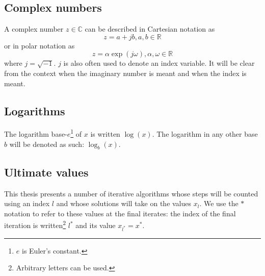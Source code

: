 \subsection{Complex numbers}

A complex number $z \in \mathbb{C}$ can be described in Cartesian notation as
\[
    z = a + jb, a,b \in \mathbb{R}
\]
or in polar notation as
\[
    z = \alpha \exp(j\omega), \alpha,\omega \in \mathbb{R}
\]
where $j = \sqrt{-1}$. $j$ is also often used to denote an index variable. It
will be clear from the context when the imaginary number is meant and when the
index is meant.

\subsection{Logarithms}

The logarithm base-$e$\footnote{$e$ is Euler's constant.} of $x$ is written
$\log(x)$. The logarithm in any other base $b$ will be denoted as such:
$\log_{b}(x)$.

\subsection{Ultimate values}

This thesis presents a number of iterative algorithms whose steps will 
be counted using an index $l$ and whose solutions will take on the values
$x_{l}$. We use the
$\ast$ notation to refer to these values at the final iterates: the index of the
final iteration is written\footnote{Arbitrary letters can be used.} $l^{\ast}$ and its value $x_{l^{\ast}}=x^{\ast}$.
